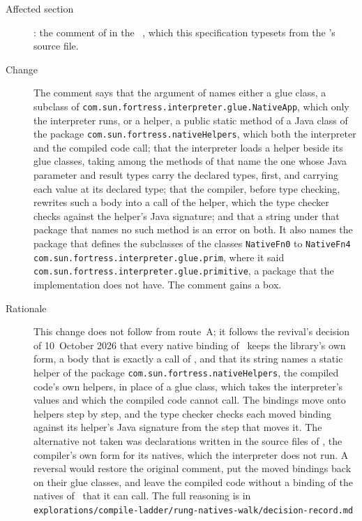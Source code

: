 \begin{description}
\item[Affected section] : the comment of
 in the \apiN\ , which this
specification typesets from the \apiN's source file.
\item[Change] The comment says that the argument of 
names either a glue class, a subclass of
\texttt{com.sun.fortress.interpreter.glue.NativeApp}, which only the
interpreter runs, or a helper, a public static method of a Java class of the
package \texttt{com.sun.fortress.nativeHelpers}, which both the interpreter
and the compiled code call; that the interpreter loads a helper beside its glue
classes, taking among the methods of that name the one whose Java parameter and
result types carry the declared types,  first, and carrying each value
at its declared type; that the compiler, before type checking, rewrites such a
body into a call of the helper, which the type checker checks against the
helper's Java signature; and that a string under that package that names no
such method is an error on both.
It also names the package that defines the subclasses of the classes
\texttt{NativeFn0} to \texttt{NativeFn4}
\texttt{com.sun.fortress.interpreter.glue.prim}, where it said
\texttt{com.sun.fortress.interpreter.glue.primitive}, a package that the
implementation does not have.
The comment gains a box.
\item[Rationale] This change does not follow from route~A; it follows the
revival's decision of 10~October 2026 that every native binding of \library\
keeps the library's own form, a body that is exactly a call of
, and that its string names a static helper of the
package \texttt{com.sun.fortress.nativeHelpers}, the compiled code's own
helpers, in place of a glue class, which takes the interpreter's values and
which the compiled code cannot call.
The bindings move onto helpers step by step, and the type checker checks each
moved binding against its helper's Java signature from the step that moves it.
The alternative not taken was \KWD{import} \KWD{java} declarations written in
the source files of \library, the compiler's own form for its natives, which
the interpreter does not run.
A reversal would restore the original comment, put the moved bindings back on
their glue classes, and leave the compiled code without a binding of the
natives of \library\ that it can call.
The full reasoning is in
\nolinkurl{explorations/compile-ladder/rung-natives-walk/decision-record.md}

\end{description}
